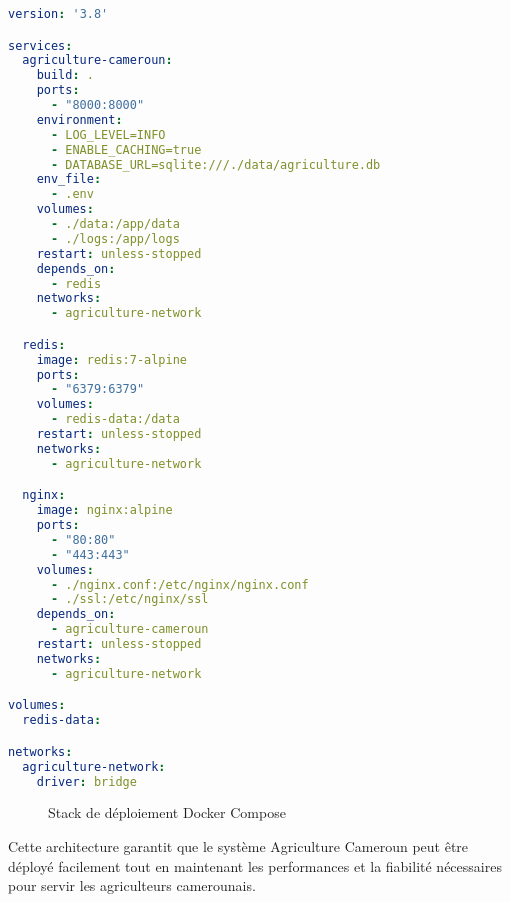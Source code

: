 \begin{lstlisting}[language=yaml, caption=Configuration Docker Compose (docker-compose.yml)]
version: '3.8'

services:
  agriculture-cameroun:
    build: .
    ports:
      - "8000:8000"
    environment:
      - LOG_LEVEL=INFO
      - ENABLE_CACHING=true
      - DATABASE_URL=sqlite:///./data/agriculture.db
    env_file:
      - .env
    volumes:
      - ./data:/app/data
      - ./logs:/app/logs
    restart: unless-stopped
    depends_on:
      - redis
    networks:
      - agriculture-network

  redis:
    image: redis:7-alpine
    ports:
      - "6379:6379"
    volumes:
      - redis-data:/data
    restart: unless-stopped
    networks:
      - agriculture-network

  nginx:
    image: nginx:alpine
    ports:
      - "80:80"
      - "443:443"
    volumes:
      - ./nginx.conf:/etc/nginx/nginx.conf
      - ./ssl:/etc/nginx/ssl
    depends_on:
      - agriculture-cameroun
    restart: unless-stopped
    networks:
      - agriculture-network

volumes:
  redis-data:

networks:
  agriculture-network:
    driver: bridge
\end{lstlisting}

\begin{figure}[H]
\centering
{}
\caption{Stack de déploiement Docker Compose}
\end{figure}

Cette architecture garantit que le système Agriculture Cameroun peut être déployé facilement tout en maintenant les performances et la fiabilité nécessaires pour servir les agriculteurs camerounais.